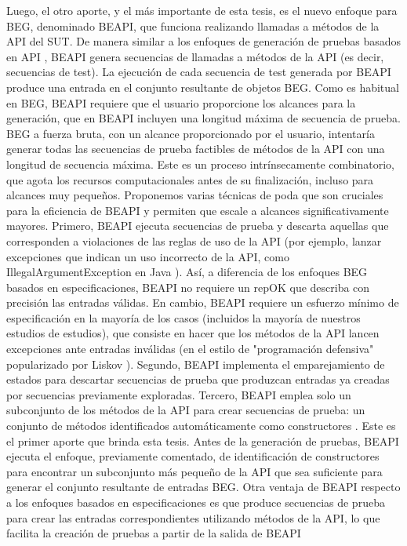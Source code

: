 Luego, el otro aporte, y el más importante de esta tesis,  es el nuevo enfoque para BEG, denominado BEAPI, que funciona realizando llamadas a métodos de la API del SUT. De manera similar a los enfoques de generación de pruebas basados en API \cite{Pacheco07, Ma15,Fraser11}, BEAPI genera secuencias de llamadas a métodos de la API (es decir, secuencias de test). La ejecución de cada secuencia de test generada por BEAPI produce una entrada en el conjunto resultante de objetos BEG. Como es habitual en BEG, BEAPI requiere que el usuario proporcione los alcances para la generación, que en BEAPI incluyen una longitud máxima de secuencia de prueba. BEG a fuerza bruta, con un alcance proporcionado por el usuario, intentaría generar todas las secuencias de prueba factibles de métodos de la API con una longitud de secuencia máxima. Este es un proceso intrínsecamente combinatorio, que agota los recursos computacionales antes de su finalización, incluso para alcances muy pequeños. Proponemos varias técnicas de poda que son cruciales para la eficiencia de BEAPI y permiten que escale a alcances significativamente mayores. Primero, BEAPI ejecuta secuencias de prueba y descarta aquellas que corresponden a violaciones de las reglas de uso de la API (por ejemplo, lanzar excepciones que indican un uso incorrecto de la API, como IllegalArgumentException en Java \cite{Liskov00, Pacheco07}). Así, a diferencia de los enfoques BEG basados en especificaciones, BEAPI no requiere un repOK que describa con precisión las entradas válidas. En cambio, BEAPI requiere un esfuerzo mínimo de especificación en la mayoría de los casos (incluidos la mayoría de nuestros estudios de estudios), que consiste en hacer que los métodos de la API lancen excepciones ante entradas inválidas (en el estilo de "programación defensiva" popularizado por Liskov \cite{Liskov00}). Segundo, BEAPI implementa el emparejamiento de estados \cite{Iosif02, Politano20, Xie04} para descartar secuencias de prueba que produzcan entradas ya creadas por secuencias previamente exploradas. Tercero, BEAPI emplea solo un subconjunto de los métodos de la API para crear secuencias de prueba: un conjunto de métodos identificados automáticamente como constructores \cite{Ponzio19}. Este es el primer aporte que brinda esta tesis. Antes de la generación de pruebas, BEAPI ejecuta el enfoque, previamente comentado, de identificación de constructores \cite{Ponzio19} para encontrar un subconjunto más pequeño de la API que sea suficiente para generar el conjunto resultante de entradas BEG. Otra ventaja de BEAPI respecto a los enfoques basados en especificaciones es que produce secuencias de prueba para crear las entradas correspondientes utilizando métodos de la API, lo que facilita la creación de pruebas a partir de la salida de BEAPI 


